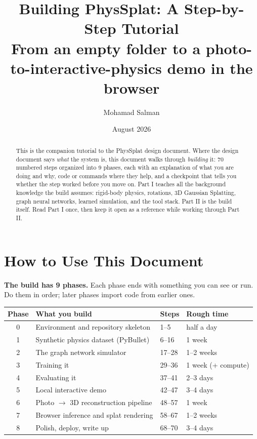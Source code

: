 \documentclass[11pt]{article}
\title{\textbf{Building PhysSplat: A Step-by-Step Tutorial}\\[6pt]
\large From an empty folder to a photo-to-interactive-physics demo in the browser}
\author{Mohamad Salman}
\date{August 2026}
\begin{document}
\maketitle

\begin{abstract}
This is the companion tutorial to the PhysSplat design document. Where the design document says \emph{what} the system is, this document walks through \emph{building} it: 70 numbered steps organized into 9 phases, each with an explanation of what you are doing and why, code or commands where they help, and a checkpoint that tells you whether the step worked before you move on. Part I teaches all the background knowledge the build assumes: rigid-body physics, rotations, 3D Gaussian Splatting, graph neural networks, learned simulation, and the tool stack. Part II is the build itself. Read Part I once, then keep it open as a reference while working through Part II.
\end{abstract}

\tableofcontents
\newpage

\section*{How to Use This Document}

\textbf{The build has 9 phases.} Each phase ends with something you can see or run. Do them in order; later phases import code from earlier ones.

\begin{center}
\begin{tabular}{@{}clll@{}}
\toprule
\textbf{Phase} & \textbf{What you build} & \textbf{Steps} & \textbf{Rough time} \\
\midrule
0 & Environment and repository skeleton & 1--5 & half a day \\
1 & Synthetic physics dataset (PyBullet) & 6--16 & 1 week \\
2 & The graph network simulator & 17--28 & 1--2 weeks \\
3 & Training it & 29--36 & 1 week (+ compute) \\
4 & Evaluating it & 37--41 & 2--3 days \\
5 & Local interactive demo & 42--47 & 3--4 days \\
6 & Photo $\rightarrow$ 3D reconstruction pipeline & 48--57 & 1 week \\
7 & Browser inference and splat rendering & 58--67 & 1--2 weeks \\
8 & Polish, deploy, write up & 68--70 & 3--4 days \\
\bottomrule
\end{tabular}
\end{center}
\end{document}
